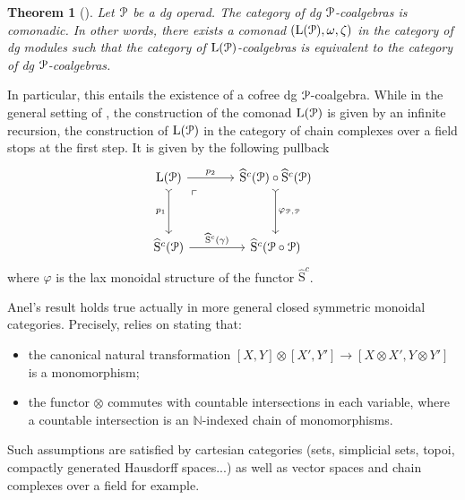 \documentclass{proc-l}
\renewcommand{\mathcal}{\EuScript}
\newcommand{\oneop}{\mathcal{P}}
\theoremstyle{plain}
\newtheorem{theorem}{Theorem}[section]
\theoremstyle{definition}
\theoremstyle{remark}
\begin{document}
\begin{theorem}[{\cite[Theorem 2.7.11]{anelcofree2014}}]%
\label{Theorem:2.10}\label{thm: cofree coalgebra over an operad}
Let $\oneop$ be a dg operad. The category of dg $\oneop$-coalgebras is comonadic. In other words, there exists a comonad $(\mathrm{L}(\oneop), \omega, \zeta)$ in the category of dg modules such that the category of $\mathrm{L}(\oneop)$-coalgebras is equivalent to the category of dg $\oneop$-coalgebras.
\end{theorem}

In particular, this entails the existence of a cofree dg $\oneop$-coalgebra. While in the general setting of \cite{anelcofree2014}, the construction of the comonad $\mathrm{L}(\oneop)$ is given by an infinite recursion, the construction of $\mathrm{L}(\oneop)$ in the category of chain complexes over a field stops at the first step. It is given by the following pullback
\[
\begin{tikzcd}[column sep=3pc,row sep=3pc]
\mathrm{L}(\oneop) \arrow[r,"p_2"] \arrow[d,"p_1",swap,rightarrowtail] \arrow[dr, phantom, "\ulcorner", very near start]
&\widehat{\mathrm{S}}^c(\oneop) \circ \widehat{\mathrm{S}}^c(\oneop) \arrow[d,"\varphi_{\oneop,\oneop}",rightarrowtail] \\
\widehat{\mathrm{S}}^c(\oneop) \arrow[r,"\widehat{\mathrm{S}}^c(\gamma)"]
&\widehat{\mathrm{S}}^c(\oneop \circ \oneop)
\end{tikzcd}
\]
where $\varphi$ is the lax monoidal structure of the functor $\widehat{\mathrm{S}}^c$.

Anel's result holds true actually in more general closed symmetric monoidal categories. Precisely, \cite[Corollary 2.7.12]{anelcofree2014} relies on \cite[Hypothesis 2.7.5]{anelcofree2014} stating that:

\begin{itemize}
\item the canonical natural transformation $[X,Y]\otimes [X',Y']\rightarrow [X\otimes X',Y\otimes Y']$ is a monomorphism;
\item the functor $\otimes$ commutes with countable intersections in each variable, where a countable intersection is an $\mathbb{N}$-indexed chain of monomorphisms.
\end{itemize}

Such assumptions are satisfied by cartesian categories (sets, simplicial sets, topoi, compactly generated Hausdorff spaces...) as well as vector spaces and chain complexes over a field for example.
\end{document}
